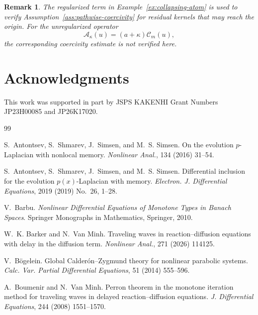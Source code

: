 \documentclass[a4paper,11pt,oneside,reqno]{amsart}
\newtheorem{remark}[theorem]{Remark}
\newcounter{c}
\newcounter{d}
\newcounter{b}
\begin{document}
\begin{remark}
The regularized term in Example~\ref{ex:collapsing-atom} is used to
verify Assumption~\ref{ass:pathwise-coercivity} for residual kernels
that may reach the origin. For the unregularized operator
\[
 \mathcal A_\kappa(u)=(a+\kappa)\mathcal C_m(u),
\]
the corresponding coercivity estimate is not verified here.
\end{remark}


\section*{Acknowledgments}
This work was supported in part by JSPS KAKENHI Grant Numbers JP23H00085 and JP26K17020.






\begin{thebibliography}{99}



S.~Antontsev, S.~Shmarev, J.~Simsen, and M.~S. Simsen.
\newblock On the evolution \(p\)-Laplacian with nonlocal memory.
\newblock \emph{Nonlinear Anal.},
134 (2016) 31--54.


S.~Antontsev, S.~Shmarev, J.~Simsen, and M.~S. Simsen.
\newblock Differential inclusion for the evolution \(p(x)\)-Laplacian
with memory.
\newblock \emph{Electron. J. Differential Equations},
2019 (2019) No.~26, 1--28.


V.~Barbu.
\newblock \emph{Nonlinear Differential Equations of Monotone Types
in Banach Spaces}.
\newblock Springer Monographs in Mathematics, Springer, 2010.


W.~K. Barker and N.~Van Minh.
\newblock Traveling waves in reaction--diffusion equations with delay
in the diffusion term.
\newblock \emph{Nonlinear Anal.}, 271 (2026) 114125.


V.~B{\"o}gelein.
\newblock Global {Calder{\'o}n--Zygmund} theory for nonlinear
parabolic systems.
\newblock \emph{Calc. Var. Partial Differential Equations},
51 (2014) 555--596.


A.~Boumenir and N.~Van Minh.
\newblock Perron theorem in the monotone iteration method for traveling
waves in delayed reaction--diffusion equations.
\newblock \emph{J. Differential Equations},
244 (2008) 1551--1570.



\end{thebibliography}
\end{document}
